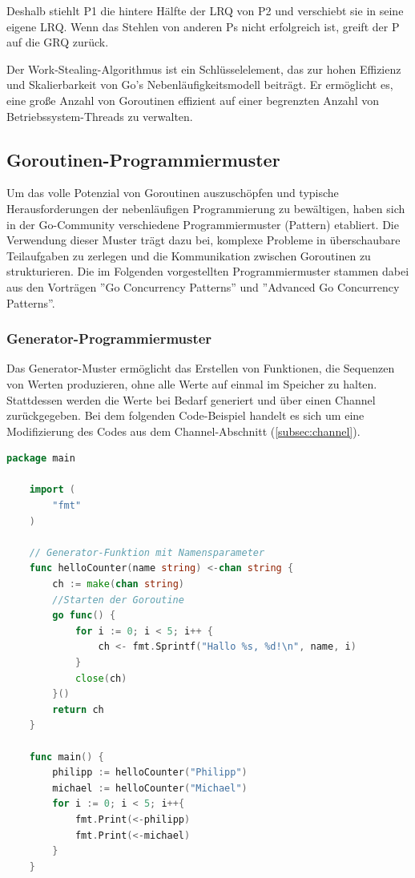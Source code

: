 \documentclass[fontsize=12pt,paper=a4,twoside=semi,parskip=half-,headsepline,headinclude]{scrreprt}
\begin{document}
Deshalb stiehlt P1 die hintere Hälfte der LRQ von P2 und verschiebt sie in seine eigene LRQ. Wenn das Stehlen von anderen Ps nicht erfolgreich ist, greift der P auf die GRQ zurück.

Der Work-Stealing-Algorithmus ist ein Schlüsselelement, das zur hohen Effizienz und Skalierbarkeit von Go's Nebenläufigkeitsmodell beiträgt. Er ermöglicht es, eine große Anzahl von Goroutinen effizient auf einer begrenzten Anzahl von Betriebssystem-Threads zu verwalten.

\subsection{Goroutinen-Programmiermuster}

Um das volle Potenzial von Goroutinen auszuschöpfen und typische Herausforderungen der nebenläufigen Programmierung zu bewältigen, haben sich in der Go-Community verschiedene Programmiermuster (Pattern) etabliert. Die Verwendung dieser Muster trägt dazu bei, komplexe Probleme in überschaubare Teilaufgaben zu zerlegen und die Kommunikation zwischen Goroutinen zu strukturieren. Die im Folgenden vorgestellten Programmiermuster stammen dabei aus den Vorträgen ''Go Concurrency Patterns''\cite{Pike2012} und ''Advanced Go Concurrency Patterns''\cite{Ajmani2013}.

\subsubsection{Generator-Programmiermuster}
\label{subsubsec:generator}

Das Generator-Muster ermöglicht das Erstellen von Funktionen, die Sequenzen von Werten produzieren, ohne alle Werte auf einmal im Speicher zu halten. Stattdessen werden die Werte bei Bedarf generiert und über einen Channel zurückgegeben. Bei dem folgenden Code-Beispiel handelt es sich um eine Modifizierung des Codes aus dem Channel-Abschnitt (\ref{subsec:channel}).

\begin{lstlisting}[language=Go,extendedchars=true]
	package main
	
	import (
		"fmt"
	)

	// Generator-Funktion mit Namensparameter
	func helloCounter(name string) <-chan string {
		ch := make(chan string)
		//Starten der Goroutine
		go func() {
			for i := 0; i < 5; i++ {
				ch <- fmt.Sprintf("Hallo %s, %d!\n", name, i)
			}
			close(ch)
		}()
		return ch
	}

	func main() {
		philipp := helloCounter("Philipp")
		michael := helloCounter("Michael")
		for i := 0; i < 5; i++{
			fmt.Print(<-philipp)
			fmt.Print(<-michael)
		}
	}
\end{lstlisting}
\end{document}
